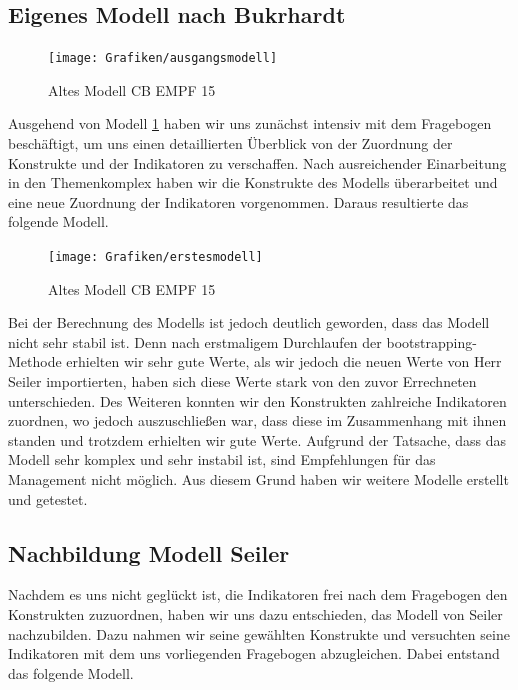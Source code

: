 \documentclass{article}\usepackage[]{graphicx}\usepackage[]{color}
\begin{document}
\subsection{Eigenes Modell nach Bukrhardt}



\begin{figure}[h!]
\centering
\hspace*{-4.8cm}\texttt{[image: Grafiken/ausgangsmodell]}
\caption{Altes Modell CB EMPF 15}
\label{ausgangsmodell}
\end{figure}

\newpage
Ausgehend von Modell \ref{ausgangsmodell} haben wir uns zunächst intensiv mit dem Fragebogen beschäftigt, um uns einen detaillierten Überblick von der Zuordnung der Konstrukte und der Indikatoren zu verschaffen. Nach ausreichender Einarbeitung in den Themenkomplex haben wir die Konstrukte des Modells überarbeitet und eine neue Zuordnung der Indikatoren vorgenommen. Daraus resultierte das folgende Modell.\\


\begin{figure}[h!]
\centering
\hspace*{-4.8cm}\texttt{[image: Grafiken/erstesmodell]}
\caption{Altes Modell CB EMPF 15}
\label{erstesmodell}
\end{figure}


\newpage
Bei der Berechnung des Modells ist jedoch deutlich geworden, dass das Modell nicht sehr stabil ist. Denn nach erstmaligem Durchlaufen der bootstrapping- Methode erhielten wir sehr gute Werte, als wir jedoch die neuen Werte von Herr Seiler importierten, haben sich diese Werte stark von den zuvor Errechneten unterschieden. Des Weiteren konnten wir den Konstrukten zahlreiche Indikatoren zuordnen, wo jedoch auszuschließen war, dass diese im Zusammenhang mit ihnen standen und trotzdem erhielten wir gute Werte. Aufgrund der Tatsache, dass das Modell sehr komplex und sehr instabil ist, sind Empfehlungen für das Management nicht möglich. Aus diesem Grund haben wir weitere Modelle erstellt und getestet. 

\subsection{Nachbildung Modell Seiler}
Nachdem es uns nicht geglückt ist, die Indikatoren frei nach dem Fragebogen den Konstrukten zuzuordnen, haben wir uns dazu entschieden, das Modell von Seiler nachzubilden. Dazu nahmen wir seine gewählten Konstrukte und versuchten seine Indikatoren mit dem uns vorliegenden Fragebogen abzugleichen. Dabei entstand das folgende Modell.
\end{document}
